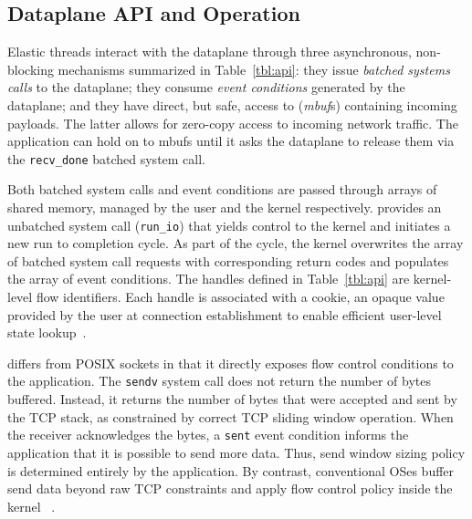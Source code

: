 \subsection{Dataplane API and Operation}
\label{sec:impl:api}

Elastic threads interact with the \ix dataplane through three
asynchronous, non-blocking mechanisms summarized in
Table~\ref{tbl:api}: they issue \emph{batched systems calls} to the
dataplane; they consume \emph{event conditions} generated by the
dataplane; and they have direct, but safe, access to (\emph{mbuf}s)
containing incoming payloads.  The latter allows for zero-copy access
to incoming network traffic.  The application can hold on to mbufs
until it asks the dataplane to release them via the
\texttt{recv\_done} batched system call.

Both batched system calls and event conditions are passed through
arrays of shared memory, managed by the user and the kernel
respectively.  \ix provides an unbatched system call
(\texttt{run\_io}) that yields control to the kernel and initiates a
new run to completion cycle. As part of the cycle, the kernel
overwrites the array of batched system call requests with
corresponding return codes and populates the array of event
conditions.  The handles defined in Table~\ref{tbl:api} are
kernel-level flow identifiers. Each handle is associated with a
cookie, an opaque value provided by the user at connection
establishment to enable efficient user-level state
lookup~\cite{DBLP:conf/osdi/HanMCR12}. %

\ix differs from POSIX sockets in that it directly exposes flow
control conditions to the application. The \texttt{sendv} system call
does not return the number of bytes buffered. Instead, it returns the
number of bytes that were accepted and sent by the TCP stack, as
constrained by correct TCP sliding window operation. When the receiver
acknowledges the bytes, a \texttt{sent} event condition informs the
application that it is possible to send more data. Thus, send window
sizing policy is determined entirely by the application.  By contrast,
conventional OSes buffer send data beyond raw TCP constraints and
apply flow control policy inside the kernel ~\cite{dynamicwindow}.


